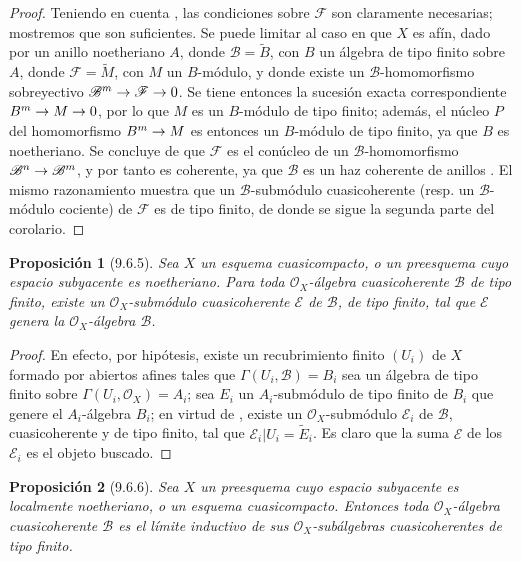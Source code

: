 \documentclass[oneside]{amsart}
\theoremstyle{ega-env-style}
\theoremstyle{ega-thm-env-style}
\newtheorem*{proposition}{Proposición}
\theoremstyle{ega-defn-env-style}
\renewcommand{\to}{\mathchoice{\longrightarrow}{\rightarrow}{\rightarrow}{\rightarrow}}
\let\EGAOriginalLabel\label
\renewcommand{\label}[1]{\phantomsection\EGAOriginalLabel{#1}}
\begin{document}
\begin{proof}
Teniendo en cuenta , las condiciones sobre $\mathscr{F}$ son claramente necesarias; mostremos que son suficientes.
Se puede limitar al caso en que $X$ es afín, dado por un anillo noetheriano $A$, donde $\mathscr{B}=\widetilde{B}$, con $B$ un álgebra de tipo finito sobre $A$, donde $\mathscr{F}=\widetilde{M}$, con $M$ un $B$-módulo, y donde existe un $\mathscr{B}$-homomorfismo sobreyectivo $\mathscr{B}^m\to\mathscr{F}\to 0$.
Se tiene entonces la sucesión exacta correspondiente $B^m\to M\to 0$, por lo que $M$ es un $B$-módulo de tipo finito; además, el núcleo $P$ del homomorfismo $B^m\to M$ es entonces un $B$-módulo de tipo finito, ya que $B$ es noetheriano.
Se concluye de  que $\mathscr{F}$ es el conúcleo de un $\mathscr{B}$-homomorfismo $\mathscr{B}^n\to\mathscr{B}^m$, y por tanto es coherente, ya que $\mathscr{B}$ es un haz coherente de anillos .
El mismo razonamiento muestra que un $\mathscr{B}$-submódulo cuasicoherente (resp. un $\mathscr{B}$-módulo cociente) de $\mathscr{F}$ es de tipo finito, de donde se sigue la segunda parte del corolario.
\end{proof}

\begin{proposition}[9.6.5]
\label{I.9.6.5}
Sea $X$ un esquema cuasicompacto, o un preesquema cuyo espacio subyacente es noetheriano.
Para toda $\mathscr{O}_X$-álgebra cuasicoherente $\mathscr{B}$ de tipo finito, existe un $\mathscr{O}_X$-submódulo cuasicoherente $\mathscr{E}$ de $\mathscr{B}$, de tipo finito, tal que $\mathscr{E}$ genera  la $\mathscr{O}_X$-álgebra $\mathscr{B}$.
\end{proposition}

\begin{proof}
En efecto, por hipótesis, existe un recubrimiento finito $(U_i)$ de $X$ formado por abiertos afines tales que $\Gamma(U_i,\mathscr{B})=B_i$ sea un álgebra de tipo finito sobre $\Gamma(U_i,\mathscr{O}_X)=A_i$; sea $E_i$ un $A_i$-submódulo de tipo finito de $B_i$ que genere el $A_i$-álgebra $B_i$; en virtud de , existe un $\mathscr{O}_X$-submódulo $\mathscr{E}_i$ de $\mathscr{B}$, cuasicoherente y de tipo finito, tal que $\mathscr{E}_i|U_i=\widetilde{E}_i$.
Es claro que la suma $\mathscr{E}$ de los $\mathscr{E}_i$ es el objeto buscado.
\end{proof}

\begin{proposition}[9.6.6]
\label{I.9.6.6}
Sea $X$ un preesquema cuyo espacio subyacente es localmente noetheriano, o un esquema cuasicompacto.
Entonces toda $\mathscr{O}_X$-álgebra cuasicoherente $\mathscr{B}$ es el límite inductivo de sus $\mathscr{O}_X$-subálgebras cuasicoherentes de tipo finito.
\end{proposition}
\end{document}
